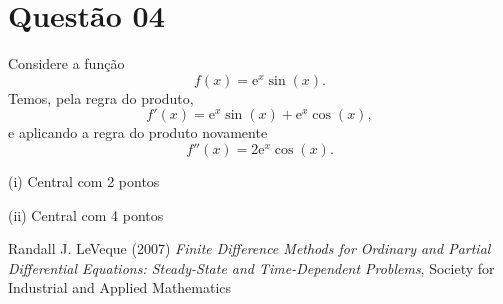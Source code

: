 \documentclass{article}
\newcommand{\euler}{\mathrm{e}}
\begin{document}
\section{Questão 04}
Considere a função 
\[ f(x) = \euler^x \sin(x).
\]
Temos, pela regra do produto, 
\[ f'(x) = \euler^x \sin(x) + \euler^x\cos(x),
\]
e aplicando a regra do produto novamente
\[ f''(x) =  2\euler^x\cos(x).
\]

(i) Central com 2 pontos

(ii) Central com 4 pontos

\begin{thebibliography}{9}
Randall J. LeVeque (2007) \emph{Finite Difference Methods for Ordinary and Partial Differential Equations:
Steady-State and Time-Dependent Problems}, Society for Industrial and Applied Mathematics 
\end{thebibliography}
\end{document}
